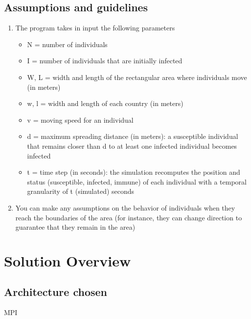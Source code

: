 \documentclass[table, 12pt]{article}
\begin{document}
\subsection{Assumptions and guidelines}
 \begin{enumerate}
 
 \item
 The program takes in input the following parameters

\begin{itemize}
\setlength\itemsep{-0.5em}

\item N = number of individuals
\item  I = number of individuals that are initially infected
\item  W, L = width and length of the rectangular area where individuals move (in meters)
\item  w, l = width and length of each country (in meters)
\item  v = moving speed for an individual
\item  d = maximum spreading distance (in meters): a susceptible individual that remains closer than d to at least one infected individual becomes infected
\item  t = time step (in seconds): the simulation recomputes the position and status (susceptible,
infected, immune) of each individual with a temporal granularity of t (simulated) seconds
\end{itemize} 
\item 
You can make any assumptions on the behavior of individuals when they reach the boundaries of the
area (for instance, they can change direction to guarantee that they remain in the area)
\end{enumerate}



\section{Solution Overview}
\subsection{Architecture chosen}
MPI
\end{document}
